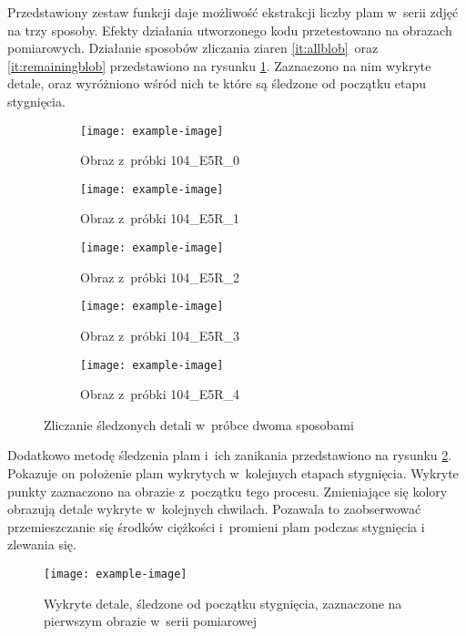 Przedstawiony zestaw funkcji daje możliwość ekstrakcji liczby plam
w~serii zdjęć na trzy sposoby.
Efekty działania utworzonego kodu przetestowano na obrazach pomiarowych.
Działanie sposobów zliczania ziaren \ref{it:allblob}~oraz
\ref{it:remainingblob} przedstawiono na rysunku \ref{fig:blobcount}.
Zaznaczono na nim wykryte detale, oraz wyróżniono wśród nich te które
są śledzone od początku etapu stygnięcia.
\begin{figure}[htbp]
	\centering
	\begin{subfigure}{0.45\textwidth}
		\centering
		\texttt{[image: example-image]}
		\caption{Obraz z~próbki 104\_E5R\_0}
	\end{subfigure}
	\hspace{0.75cm}
	\vspace{0.5cm}
	\begin{subfigure}{0.45\textwidth}
		\centering
		\texttt{[image: example-image]}
		\caption{Obraz z~próbki 104\_E5R\_1}
	\end{subfigure}
	\begin{subfigure}{0.45\textwidth}
		\centering
		\texttt{[image: example-image]}
		\caption{Obraz z~próbki 104\_E5R\_2}
	\end{subfigure}
	\hspace{0.75cm}
	\vspace{0.5cm}
	\begin{subfigure}{0.45\textwidth}
		\centering
		\texttt{[image: example-image]}
		\caption{Obraz z~próbki 104\_E5R\_3}
	\end{subfigure}
	\begin{subfigure}{0.45\textwidth}
		\centering
		\texttt{[image: example-image]}
		\caption{Obraz z~próbki 104\_E5R\_4}
	\end{subfigure}
	\caption{Zliczanie śledzonych detali w~próbce dwoma sposobami}
	\label{fig:blobcount}
\end{figure}
Dodatkowo metodę śledzenia plam i~ich zanikania przedstawiono na rysunku
\ref{fig:blobremain}.
Pokazuje on położenie plam wykrytych w~kolejnych etapach stygnięcia.
Wykryte punkty zaznaczono na obrazie z~początku tego procesu.
Zmieniające się kolory obrazują detale wykryte w~kolejnych chwilach.
Pozawala to zaobserwować przemieszczanie się środków ciężkości i~promieni
plam podczas stygnięcia i zlewania się.
\begin{figure}[htbp]
    \centering
    \texttt{[image: example-image]}
    \caption{Wykryte detale, śledzone od początku stygnięcia, zaznaczone na
             pierwszym obrazie w~serii pomiarowej}
    \label{fig:blobremain}
\end{figure}

